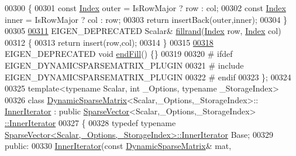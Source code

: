 \begin{DoxyCode}
00300     \{
00301       \textcolor{keyword}{const} \hyperlink{group___core___module_a554f30542cc2316add4b1ea0a492ff02}{Index} outer = IsRowMajor ? row : col;
00302       \textcolor{keyword}{const} \hyperlink{group___core___module_a554f30542cc2316add4b1ea0a492ff02}{Index} inner = IsRowMajor ? col : row;
00303       \textcolor{keywordflow}{return} insertBack(outer,inner);
00304     \}
00305 
\hyperlink{class_eigen_1_1_dynamic_sparse_matrix_a6a5eb3c9d153d8ebdf4e0967321108e2}{00311}     EIGEN\_DEPRECATED Scalar& \hyperlink{class_eigen_1_1_dynamic_sparse_matrix_a6a5eb3c9d153d8ebdf4e0967321108e2}{fillrand}(\hyperlink{group___core___module_a554f30542cc2316add4b1ea0a492ff02}{Index} row, \hyperlink{group___core___module_a554f30542cc2316add4b1ea0a492ff02}{Index} col)
00312     \{
00313       \textcolor{keywordflow}{return} insert(row,col);
00314     \}
00315 
\hyperlink{class_eigen_1_1_dynamic_sparse_matrix_aa806b3dde0a055844110610907b016f3}{00318}     EIGEN\_DEPRECATED \textcolor{keywordtype}{void} \hyperlink{class_eigen_1_1_dynamic_sparse_matrix_aa806b3dde0a055844110610907b016f3}{endFill}() \{\}
00319     
00320 \textcolor{preprocessor}{#   ifdef EIGEN\_DYNAMICSPARSEMATRIX\_PLUGIN}
00321 \textcolor{preprocessor}{#     include EIGEN\_DYNAMICSPARSEMATRIX\_PLUGIN}
00322 \textcolor{preprocessor}{#   endif}
00323  \};
00324 
00325 \textcolor{keyword}{template}<\textcolor{keyword}{typename} Scalar, \textcolor{keywordtype}{int} \_Options, \textcolor{keyword}{typename} \_StorageIndex>
00326 \textcolor{keyword}{class }\hyperlink{class_eigen_1_1_dynamic_sparse_matrix}{DynamicSparseMatrix}<Scalar,\_Options,\_StorageIndex>::
      \hyperlink{class_eigen_1_1_dynamic_sparse_matrix_1_1_inner_iterator}{InnerIterator} : \textcolor{keyword}{public} \hyperlink{group___sparse_core___module_class_eigen_1_1_sparse_vector}{SparseVector}<Scalar,\_Options,\_StorageIndex>
      \hyperlink{class_eigen_1_1_dynamic_sparse_matrix_1_1_inner_iterator}{::InnerIterator}
00327 \{
00328     \textcolor{keyword}{typedef} \textcolor{keyword}{typename} \hyperlink{class_eigen_1_1_sparse_compressed_base_1_1_inner_iterator}{SparseVector<Scalar,\_Options,\_StorageIndex>::InnerIterator}
       Base;
00329   \textcolor{keyword}{public}:
00330     \hyperlink{class_eigen_1_1_dynamic_sparse_matrix_1_1_inner_iterator}{InnerIterator}(\textcolor{keyword}{const} \hyperlink{class_eigen_1_1_dynamic_sparse_matrix}{DynamicSparseMatrix}& mat, 

\end{DoxyCode}
